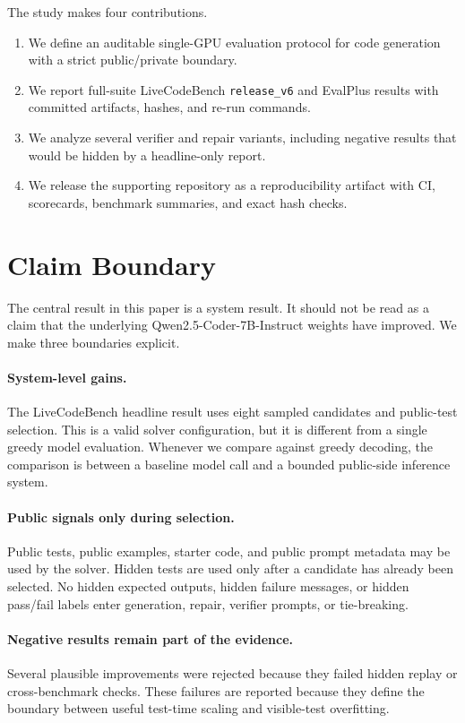 \documentclass[11pt]{article}
\begin{document}
The study makes four contributions.

\begin{enumerate}
    \item We define an auditable single-GPU evaluation protocol for code
    generation with a strict public/private boundary.
    \item We report full-suite LiveCodeBench \texttt{release\_v6} and EvalPlus
    results with committed artifacts, hashes, and re-run commands.
    \item We analyze several verifier and repair variants, including negative
    results that would be hidden by a headline-only report.
    \item We release the supporting repository as a reproducibility artifact
    with CI, scorecards, benchmark summaries, and exact hash checks.
\end{enumerate}

\section{Claim Boundary}

The central result in this paper is a system result. It should not be read as a
claim that the underlying Qwen2.5-Coder-7B-Instruct weights have improved. We
make three boundaries explicit.

\paragraph{System-level gains.}
The LiveCodeBench headline result uses eight sampled candidates and public-test
selection. This is a valid solver configuration, but it is different from a
single greedy model evaluation. Whenever we compare against greedy decoding, the
comparison is between a baseline model call and a bounded public-side inference
system.

\paragraph{Public signals only during selection.}
Public tests, public examples, starter code, and public prompt metadata may be
used by the solver. Hidden tests are used only after a candidate has already
been selected. No hidden expected outputs, hidden failure messages, or hidden
pass/fail labels enter generation, repair, verifier prompts, or tie-breaking.

\paragraph{Negative results remain part of the evidence.}
Several plausible improvements were rejected because they failed hidden replay
or cross-benchmark checks. These failures are reported because they define the
boundary between useful test-time scaling and visible-test overfitting.
\end{document}
